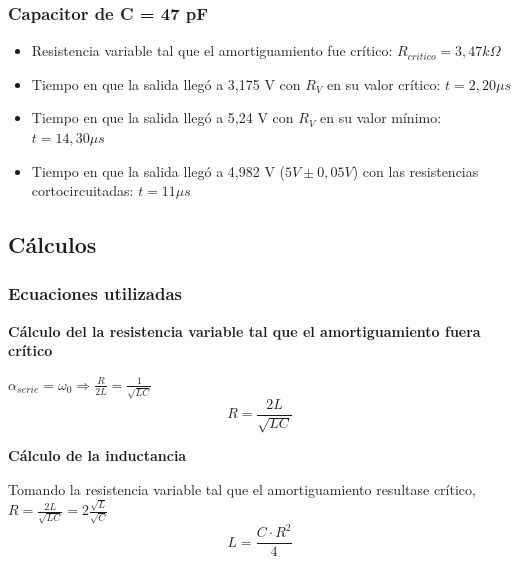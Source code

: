 \documentclass{article}
\begin{document}
        \par
        \subsubsection*{Capacitor de C = 47 pF}
            \begin{itemize}
                \item Resistencia variable tal que el amortiguamiento fue crítico: $ R_{critico} = 3,47 k\Omega $ %
                \item Tiempo en que la salida llegó a 3,175 V con $ R_V $ en su valor crítico: $ t = 2,20 \mu s$ %
                \item Tiempo en que la salida llegó a 5,24 V con $ R_V $ en su valor mínimo: $ t = 14,30 \mu s$ %
                \item Tiempo en que la salida llegó a 4,982 V ($ 5V \pm 0,05V $) con las resistencias cortocircuitadas: $ t = 11 \mu s$ %
            \end{itemize}

    \subsection{Cálculos}

        \subsubsection{Ecuaciones utilizadas}            

            \textbf{Cálculo del la resistencia variable tal que el amortiguamiento fuera crítico} \par \par
            $ \alpha_{serie} = \omega_0 \Rightarrow \frac{R}{2L} = \frac{1}{\sqrt{LC}}  $
            \begin{equation}
                R = \frac{2L}{\sqrt{LC}}
            \end{equation}  \par \par 

            \textbf{Cálculo de la inductancia} \par \par
            Tomando la resistencia variable tal que el amortiguamiento resultase crítico,
            $ R = \frac{2L}{\sqrt{LC}} = 2\frac{\sqrt{L}}{\sqrt{C}} $
            \begin{equation}
                L = \frac{C \cdot R^2}{4}
            \end{equation}
\end{document}
